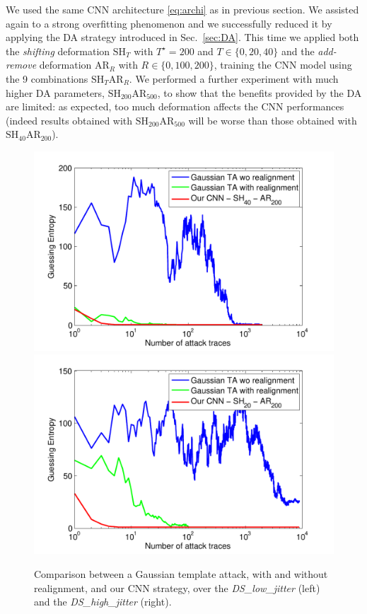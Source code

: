 We used the same CNN architecture \eqref{eq:archi} as in previous section. We assisted again to a strong overfitting phenomenon and we successfully reduced it by applying the DA strategy introduced in Sec.~\ref{sec:DA}. This time we applied both the \emph{shifting} deformation $\mathrm{SH}_T$ with $T^\star = 200$ and $T\in\{0,20,40\}$ and the \emph{add-remove} deformation $\mathrm{AR}_R$ with $R\in \{0,100,200\}$, training the CNN model using the 9 combinations $\mathrm{SH}_T\mathrm{AR}_R$. We performed a further experiment with much higher DA parameters, \ie $\mathrm{SH}_{200}\mathrm{AR}_{500}$, to show that the benefits provided by the DA are limited: as expected, too much deformation affects the CNN performances (indeed results obtained with $\mathrm{SH}_{200}\mathrm{AR}_{500}$ will be worse than those obtained with \eg $\mathrm{SH}_{40}\mathrm{AR}_{200}$).

\begin{figure}
\includegraphics[width=.5\textwidth]{../Figures/CHES2017/results_low_jitter_new.pdf} 
\includegraphics[width=.5\textwidth]{../Figures/CHES2017/results_high_jitter_new.pdf} 
\caption{Comparison between a Gaussian template attack, with and without realignment, and our CNN strategy, over the  \emph{DS\_low\_jitter} (left) and the  \emph{DS\_high\_jitter} (right).}\label{fig:compareTA}
\end{figure}




